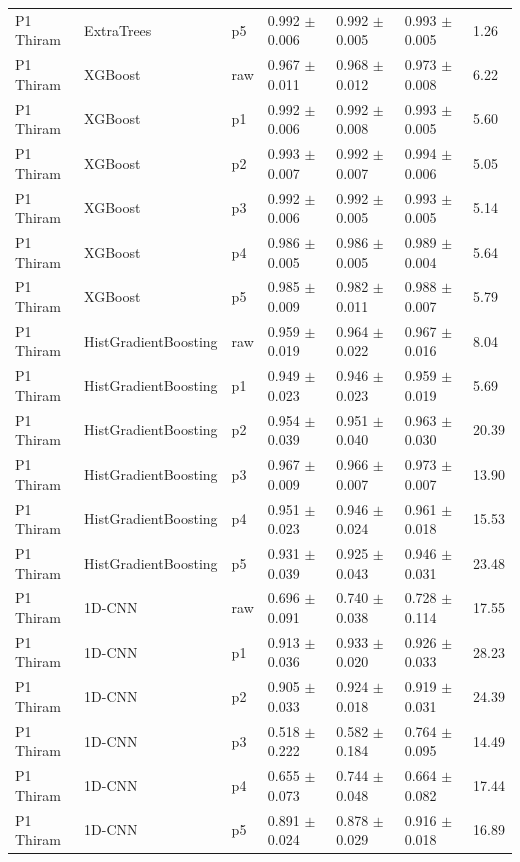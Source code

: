 {\begin{longtable}{L{2.35cm}L{2.4cm}L{1.0cm}L{2.35cm}L{2.25cm}L{2.25cm}L{1.45cm}}
P1 Thiram & ExtraTrees & p5 & 0.992 $\pm$ 0.006 & 0.992 $\pm$ 0.005 & 0.993 $\pm$ 0.005 & 1.26 \\
P1 Thiram & XGBoost & raw & 0.967 $\pm$ 0.011 & 0.968 $\pm$ 0.012 & 0.973 $\pm$ 0.008 & 6.22 \\
P1 Thiram & XGBoost & p1 & 0.992 $\pm$ 0.006 & 0.992 $\pm$ 0.008 & 0.993 $\pm$ 0.005 & 5.60 \\
P1 Thiram & XGBoost & p2 & 0.993 $\pm$ 0.007 & 0.992 $\pm$ 0.007 & 0.994 $\pm$ 0.006 & 5.05 \\
P1 Thiram & XGBoost & p3 & 0.992 $\pm$ 0.006 & 0.992 $\pm$ 0.005 & 0.993 $\pm$ 0.005 & 5.14 \\
P1 Thiram & XGBoost & p4 & 0.986 $\pm$ 0.005 & 0.986 $\pm$ 0.005 & 0.989 $\pm$ 0.004 & 5.64 \\
P1 Thiram & XGBoost & p5 & 0.985 $\pm$ 0.009 & 0.982 $\pm$ 0.011 & 0.988 $\pm$ 0.007 & 5.79 \\
P1 Thiram & HistGradientBoosting & raw & 0.959 $\pm$ 0.019 & 0.964 $\pm$ 0.022 & 0.967 $\pm$ 0.016 & 8.04 \\
P1 Thiram & HistGradientBoosting & p1 & 0.949 $\pm$ 0.023 & 0.946 $\pm$ 0.023 & 0.959 $\pm$ 0.019 & 5.69 \\
P1 Thiram & HistGradientBoosting & p2 & 0.954 $\pm$ 0.039 & 0.951 $\pm$ 0.040 & 0.963 $\pm$ 0.030 & 20.39 \\
P1 Thiram & HistGradientBoosting & p3 & 0.967 $\pm$ 0.009 & 0.966 $\pm$ 0.007 & 0.973 $\pm$ 0.007 & 13.90 \\
P1 Thiram & HistGradientBoosting & p4 & 0.951 $\pm$ 0.023 & 0.946 $\pm$ 0.024 & 0.961 $\pm$ 0.018 & 15.53 \\
P1 Thiram & HistGradientBoosting & p5 & 0.931 $\pm$ 0.039 & 0.925 $\pm$ 0.043 & 0.946 $\pm$ 0.031 & 23.48 \\
P1 Thiram & 1D-CNN & raw & 0.696 $\pm$ 0.091 & 0.740 $\pm$ 0.038 & 0.728 $\pm$ 0.114 & 17.55 \\
P1 Thiram & 1D-CNN & p1 & 0.913 $\pm$ 0.036 & 0.933 $\pm$ 0.020 & 0.926 $\pm$ 0.033 & 28.23 \\
P1 Thiram & 1D-CNN & p2 & 0.905 $\pm$ 0.033 & 0.924 $\pm$ 0.018 & 0.919 $\pm$ 0.031 & 24.39 \\
P1 Thiram & 1D-CNN & p3 & 0.518 $\pm$ 0.222 & 0.582 $\pm$ 0.184 & 0.764 $\pm$ 0.095 & 14.49 \\
P1 Thiram & 1D-CNN & p4 & 0.655 $\pm$ 0.073 & 0.744 $\pm$ 0.048 & 0.664 $\pm$ 0.082 & 17.44 \\
P1 Thiram & 1D-CNN & p5 & 0.891 $\pm$ 0.024 & 0.878 $\pm$ 0.029 & 0.916 $\pm$ 0.018 & 16.89 \\

\end{longtable}}
